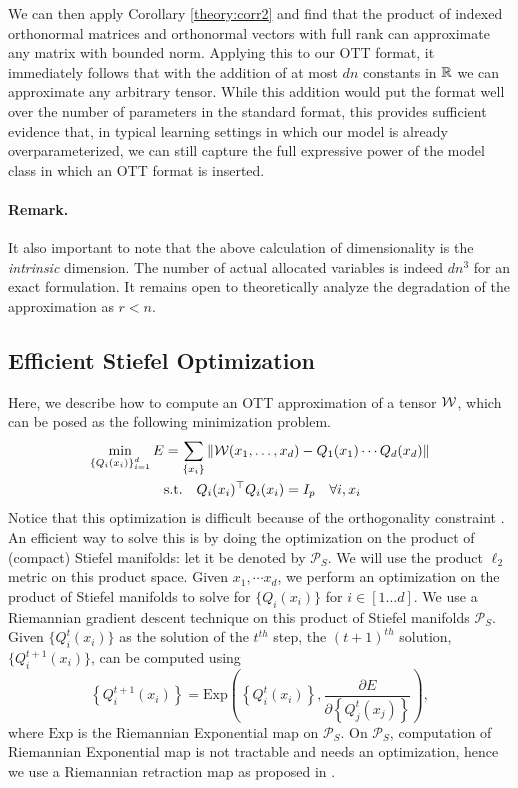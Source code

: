 We can then apply Corollary \ref{theory:corr2} and find that the product of indexed orthonormal matrices and orthonormal vectors with full rank can approximate any matrix with bounded norm. 
Applying this to our OTT format, it immediately follows that with  the addition of at most $dn$ constants in $\mathbb{R}$ we can approximate any arbitrary tensor. While this addition would put the format well over the number of parameters in the standard format, this provides sufficient evidence that, in typical learning settings in which our model is already overparameterized, we can still capture the full expressive power of the model class in which an OTT format is inserted. 

\paragraph{Remark.} It also important to note that the above calculation of dimensionality is the \textit{intrinsic} dimension. The number of actual allocated variables is indeed $dn^3$ for an exact formulation.
It remains open to theoretically analyze the degradation of the approximation as $r<n$.

\subsection{Efficient Stiefel Optimization}\label{sec:opt}
Here, we describe how to compute an OTT approximation of a tensor $\mathcal{W}$, which can be posed as the following minimization problem.
\vspace{-5pt}
\begin{align}
\min_{\left\{Q_i(x_i)\right\}_{i=1}^d} E &= \sum_{\left\{x_i\right\}} \|\mathcal{W}(x_1,\ldots,x_d) - Q_1(x_1)\cdots Q_d(x_d)\| \notag \\ \quad & \mbox{s.t.} \quad Q_i(x_i)^\top Q_i(x_i) = I_p \quad \forall i, x_i
\end{align}
Notice that this optimization is difficult because of the orthogonality constraint \cite{edelman1998geometry,collins2014spectral}. An efficient way to solve this is by doing the optimization on the product of (compact) Stiefel manifolds: let it be denoted by $\mathcal{P}_S$. We will use the product $\ell_2$ metric on this product space. Given $x_1, \cdots x_d$, we perform
an optimization on the product of Stiefel manifolds to solve for $\{Q_i(x_i)\}$ for $i\in[1\ldots d]$. We use a Riemannian gradient descent technique on this product of Stiefel manifolds $\mathcal{P}_S$. Given $\{Q^t_i(x_i)\}$ as the solution of the $t^{th}$ step, the $(t+1)^{th}$ solution, $\{Q^{t+1}_i(x_i)\}$, can be computed using 
\vspace{-5pt}
\begin{equation}
\left\{Q^{t+1}_i(x_i)\right\} = \text{Exp}\left(\left\{Q^{t}_i(x_i)\right\}, \frac{\partial E}{\partial \left\{Q^{t}_j(x_j)\right\}}\right),
\end{equation}
where $\text{Exp}$ is the Riemannian Exponential map on $\mathcal{P}_S$. On $\mathcal{P}_S$, computation of Riemannian Exponential map is not tractable and needs an optimization, hence we
use a Riemannian retraction map as proposed in \cite{6340355}.

